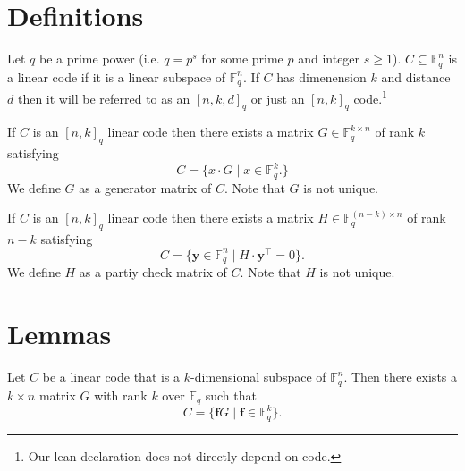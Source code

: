 \section{Definitions}
\begin{definition}
\label{def:LC_subspace}
\leanok
{}
Let $q$ be a prime power (i.e. $q = p^{s}$ for some prime $p$ and integer $s \geq 1$).
$C \subseteq \mathbb{F}^{n}_{q}$ is a linear code if it is a linear subspace of $\mathbb{F}^{n}_{q}$.
If $C$ has dimenension $k$ and distance $d$ then it will be referred to as an $[n,k,d]_{q}$ or just an $[n,k]_{q}$ code.\footnote{Our lean declaration does not directly depend on code.}
\end{definition}

\begin{definition}
\label{def:GeneratorMatrix}
\leanok
{}
If $C$ is an $[n, k]_{q}$ linear code then there exists a matrix $G \in \mathbb{F}^{k \times n}_{q}$ of rank $k$ satisfying
\[C = \{x \cdot G \mid x \in \mathbb{F}^{k}_{q}.\}\]
We define $G$ as a generator matrix of $C$.
Note that $G$ is not unique.
\end{definition}

\begin{definition}
\label{def:ParityCheckMatrix}
\leanok
{}
If $C$ is an $[n, k]_{q}$ linear code then there exists a matrix $H \in \mathbb{F}^{(n-k) \times n}_{q}$ of rank $n - k$ satisfying
\[C = \{\mathbf{y} \in \mathbb{F}^{n}_{q} \mid H \cdot \mathbf{y}^{\intercal} = 0\}.\]
We define $H$ as a partiy check matrix of $C$.
Note that $H$ is not unique.
\end{definition}


\section{Lemmas}

\begin{lemma}
    \label{lemma:subspace-imp-generator}
    Let $C$ be a linear code that is a $k$-dimensional subspace of $\mathbb{F}^{n}_{q}$.
    Then there exists a $k \times n$ matrix $G$ with rank $k$ over $\mathbb{F}_q$ such that
    \[
        C = \{\mathbf{f}G \mid \mathbf{f} \in \mathbb{F}^{k}_{q}\}.
    \]
\end{lemma}

